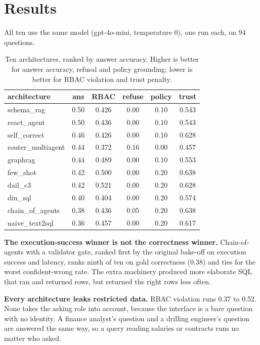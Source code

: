 \documentclass[10pt,twocolumn]{article}
\begin{document}
\section{Results}
All ten use the same model (gpt-4o-mini, temperature 0), one run each, on 94 questions.

\begin{table}[t]
\centering\small
\caption{Ten architectures, ranked by answer accuracy. Higher is better for answer accuracy, refusal
and policy grounding; lower is better for RBAC violation and trust penalty.}
\begin{tabular}{lccccc}
\toprule
architecture & ans & RBAC & refuse & policy & trust \\
\midrule
schema\_rag        & 0.50 & 0.426 & 0.00 & 0.10 & 0.543 \\
react\_agent       & 0.50 & 0.436 & 0.00 & 0.10 & 0.543 \\
self\_correct      & 0.46 & 0.426 & 0.00 & 0.10 & 0.628 \\
router\_multiagent & 0.44 & 0.372 & 0.16 & 0.00 & 0.457 \\
graphrag           & 0.44 & 0.489 & 0.00 & 0.10 & 0.553 \\
few\_shot          & 0.42 & 0.500 & 0.00 & 0.20 & 0.638 \\
dail\_c3           & 0.42 & 0.521 & 0.00 & 0.20 & 0.628 \\
din\_sql           & 0.40 & 0.404 & 0.00 & 0.20 & 0.574 \\
chain\_of\_agents  & 0.38 & 0.436 & 0.05 & 0.20 & 0.638 \\
naive\_text2sql    & 0.36 & 0.457 & 0.00 & 0.20 & 0.617 \\
\bottomrule
\end{tabular}
\end{table}

\textbf{The execution-success winner is not the correctness winner.} Chain-of-agents with a validator
gate, ranked first by the original bake-off on execution success and latency, ranks ninth of ten on
gold correctness (0.38) and ties for the worst confident-wrong rate. The extra machinery produced more
elaborate SQL that ran and returned rows, but returned the right rows less often.

\textbf{Every architecture leaks restricted data.} RBAC violation runs 0.37 to 0.52. None takes the
asking role into account, because the interface is a bare question with no identity. A finance analyst's
question and a drilling engineer's question are answered the same way, so a query reading salaries or
contracts runs no matter who asked.
\end{document}
